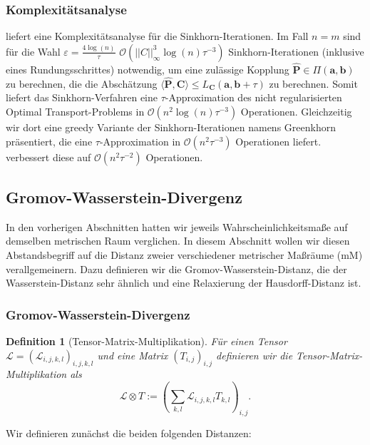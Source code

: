 \documentclass[11pt,a4paper]{article}
\newtheorem{definition}[theorem]{Definition}
\numberwithin{equation}{section}
\begin{document}
	\subsubsection{Komplexitätsanalyse}
	\cite{altschuler2017near} liefert eine Komplexitätsanalyse für die Sinkhorn-Iterationen. Im Fall $n=m$ sind für die Wahl $\varepsilon = \frac{4 \log (n)}{\tau}$ $\mathcal{O}(||C||_\infty^3 \log (n)\tau ^{-3})$ Sinkhorn-Iterationen (inklusive eines Rundungsschrittes) notwendig, um eine zulässige Kopplung $\hat{\boldsymbol{P}} \in \Pi(\boldsymbol{a}, \boldsymbol{b})$ zu berechnen, die die Abschätzung $\langle \hat{\boldsymbol{P}}, \boldsymbol{C} \rangle \leq L_{\boldsymbol{C}}(\boldsymbol{a}, \boldsymbol{b} +  \tau)$ zu berechnen. Somit liefert das Sinkhorn-Verfahren eine $\tau$-Approximation des nicht regularisierten Optimal Transport-Problems in $\mathcal{O}(n^2 \log (n)\tau ^{-3})$ Operationen.
	Gleichzeitig wir dort eine greedy Variante der Sinkhorn-Iterationen namens Greenkhorn präsentiert, die eine $\tau$-Approximation in $\mathcal{O}(n^2\tau^{-3})$ Operationen liefert.
	\cite{dvurechensky2018computational} verbessert diese auf $\mathcal{O}(n^2\tau^{-2})$ Operationen.
	\subsection{Gromov-Wasserstein-Divergenz}
	In den vorherigen Abschnitten hatten wir jeweils Wahrscheinlichkeitsmaße auf demselben metrischen Raum verglichen. In diesem Abschnitt wollen wir diesen Abstandsbegriff auf die Distanz zweier verschiedener metrischer Maßräume (mM) verallgemeinern. Dazu definieren wir die Gromov-Wasserstein-Distanz, die der Wasserstein-Distanz sehr ähnlich und eine Relaxierung der Hausdorff-Distanz ist.
	
	\subsubsection{Gromov-Wasserstein-Divergenz}
	
	
	\begin{definition}[Tensor-Matrix-Multiplikation]
		Für einen Tensor $\mathcal{L} = (\mathcal{L}_{i,j,k,l})_{i,j,k,l}$ und eine Matrix $(T_{i,j})_{i,j}$ definieren wir die Tensor-Matrix-Multiplikation als
		\begin{equation}
		\mathcal{L} \otimes T := \left(\sum_{k,l}{\mathcal{L}_{i,j,k,l}T_{k,l}}\right)_{i,j}. \label{eq:tensor_matrix_mul}
		\end{equation}
	\end{definition}
	\cite{vialard2019elementary}
	Wir definieren zunächst die beiden folgenden Distanzen:
	
\end{document}
